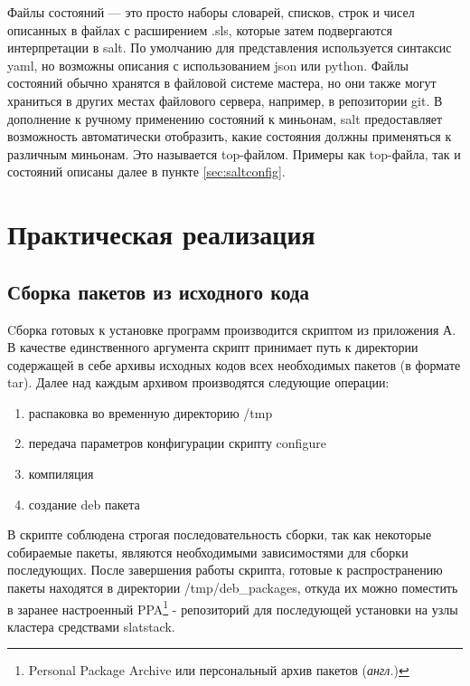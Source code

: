 \documentclass[a4paper]{extarticle}
\begin{document}
Файлы состояний --- это просто наборы словарей, списков, строк и чисел описанных в файлах с расширением .sls, которые затем подвергаются интерпретации в salt. По умолчанию для представления используется синтаксис yaml, но возможны описания с использованием json или python. Файлы состояний обычно хранятся в файловой системе мастера, но они также могут храниться в других местах файлового сервера, например, в репозитории git. В дополнение к ручному применению состояний к миньонам, salt предоставляет возможность автоматически отобразить, какие состояния должны применяться к различным миньонам. Это называется top-файлом. Примеры как top-файла, так и состояний описаны далее в пункте \ref{sec:saltconfig}.

\newpage

\section{Практическая реализация}

\setcounter{figure}{0}

\subsection{Сборка пакетов из исходного кода}

Cборка готовых к установке программ производится скриптом из приложения А. В качестве единственного аргумента скрипт принимает путь к директории содержащей в себе архивы исходных
кодов всех необходимых пакетов (в формате tar).  Далее над каждым архивом производятся следующие операции:

\begin{enumerate}
\item распаковка во временную директорию /tmp
\item передача параметров конфигурации скрипту configure
\item компиляция
\item создание deb пакета
\end{enumerate}

В скрипте соблюдена строгая последовательность сборки, так как некоторые собираемые пакеты, являются необходимыми зависимостями для сборки последующих.
После завершения работы скрипта, готовые к распространению пакеты находятся в директории /tmp/deb\_packages, откуда их можно поместить в заранее настроенный PPA\footnote{Personal Package Archive или персональный архив пакетов (\emph{англ.})}  - репозиторий для последующей установки на узлы кластера средствами slatstack.
\end{document}
